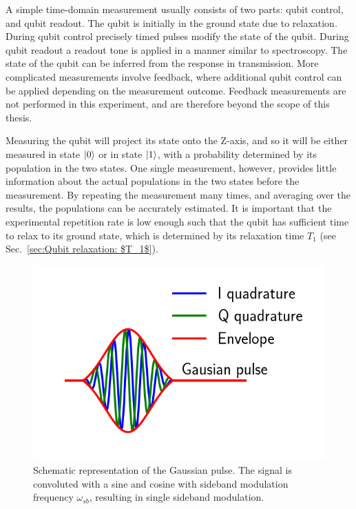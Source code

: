        A simple time-domain measurement usually consists of two parts: qubit control, and qubit readout. The qubit is initially in the ground state due to relaxation. During qubit control precisely timed pulses modify the state of the qubit. During qubit readout a readout tone is applied in a manner similar to spectroscopy. The state of the qubit can be inferred from the response in transmission. More complicated measurements involve feedback, where additional qubit control can be applied depending on the measurement outcome. Feedback measurements are not performed in this experiment, and are therefore beyond the scope of this thesis.

        Measuring the qubit will project its state onto the Z-axis, and so it will be either measured in state $\ket{0}$ or in state $\ket{1}$, with a probability determined by its population in the two states. One single measurement, however, provides little information about the actual populations in the two states before the measurement. By repeating the measurement many times, and averaging over the results, the populations can be accurately estimated. It is important that the experimental repetition rate is low enough such that the qubit has sufficient time to relax to its ground state, which is determined by its relaxation time $T_1$ (see Sec.~\ref{sec:Qubit relaxation: $T_1$}).

        \begin{figure}
          \begin{center}
          \vspace{-30pt}
            \includegraphics[width=\textwidth]{Figures/Exploring frequency re-use/Gaussian pulse.png}
          \end{center}
          \vspace{-20 pt}
          \caption{Schematic representation of the Gaussian pulse. The signal is convoluted with a sine and cosine with sideband modulation frequency $\omega_{sb}$, resulting in single sideband modulation.}
          \label{fig:gaussian pulse}
        \end{figure}

